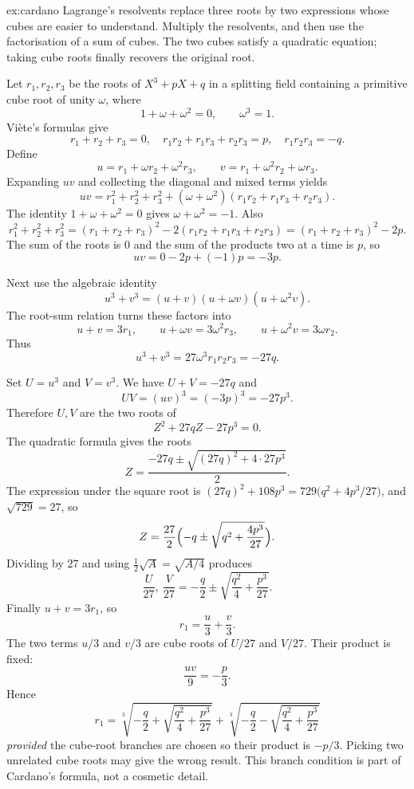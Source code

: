 \begin{solution}{ex:cardano}
\idea Lagrange's resolvents replace three roots by two expressions whose cubes are easier to understand. Multiply the resolvents, and then use the factorisation of a sum of cubes. The two cubes satisfy a quadratic equation; taking cube roots finally recovers the original root.

\writeup Let $r_1,r_2,r_3$ be the roots of $X^3+pX+q$ in a splitting field containing a primitive cube root of unity $\omega$, where
\[
1+\omega+\omega^2=0,\qquad \omega^3=1.
\]
Viète's formulas give
\[
r_1+r_2+r_3=0,\quad
r_1r_2+r_1r_3+r_2r_3=p,\quad
r_1r_2r_3=-q.
\]
Define
\[
u=r_1+\omega r_2+\omega^2r_3,\qquad
v=r_1+\omega^2r_2+\omega r_3.
\]
Expanding $uv$ and collecting the diagonal and mixed terms yields
\[
uv=r_1^2+r_2^2+r_3^2+(\omega+\omega^2)(r_1r_2+r_1r_3+r_2r_3).
\]
The identity $1+\omega+\omega^2=0$ gives $\omega+\omega^2=-1$. Also
\[
r_1^2+r_2^2+r_3^2=(r_1+r_2+r_3)^2-2(r_1r_2+r_1r_3+r_2r_3)=(r_1+r_2+r_3)^2-2p.
\]
The sum of the roots is $0$ and the sum of the products two at a time is $p$, so
\[
uv=0-2p+(-1)p=-3p.
\]

Next use the algebraic identity
\[
u^3+v^3=(u+v)(u+\omega v)(u+\omega^2v).
\]
The root-sum relation turns these factors into
\[
u+v=3r_1,\qquad
u+\omega v=3\omega^2r_3,\qquad
u+\omega^2v=3\omega r_2.
\]
Thus
\[
u^3+v^3=27\omega^3r_1r_2r_3=-27q.
\]

Set $U=u^3$ and $V=v^3$. We have $U+V=-27q$ and
\[
UV=(uv)^3=(-3p)^3=-27p^3.
\]
Therefore $U,V$ are the two roots of
\[
Z^2+27qZ-27p^3=0.
\]
The quadratic formula gives the roots
\[
Z=\frac{-27q\pm\sqrt{(27q)^2+4\cdot27p^3}}{2}.
\]
The expression under the square root is $(27q)^2+108p^3=729\bigl(q^2+4p^3/27\bigr)$, and $\sqrt{729}=27$, so
\[
Z=\frac{27}{2}\Bigl(-q\pm\sqrt{q^2+\frac{4p^3}{27}}\Bigr).
\]
Dividing by $27$ and using $\frac12\sqrt{A}=\sqrt{A/4}$ produces
\[
\frac{U}{27},\ \frac{V}{27}
=-\frac q2\pm\sqrt{\frac{q^2}{4}+\frac{p^3}{27}}.
\]
Finally $u+v=3r_1$, so
\[
r_1=\frac u3+\frac v3.
\]
The two terms $u/3$ and $v/3$ are cube roots of $U/27$ and $V/27$. Their product is fixed:
\[
\frac{uv}{9}=-\frac p3.
\]
Hence
\[
\boxed{
r_1=
\sqrt[3]{-\frac q2+\sqrt{\frac{q^2}{4}+\frac{p^3}{27}}}
+\sqrt[3]{-\frac q2-\sqrt{\frac{q^2}{4}+\frac{p^3}{27}}}
}
\]
\emph{provided} the cube-root branches are chosen so their product is $-p/3$. Picking two unrelated cube roots may give the wrong result. This branch condition is part of Cardano's formula, not a cosmetic detail.
\end{solution}


